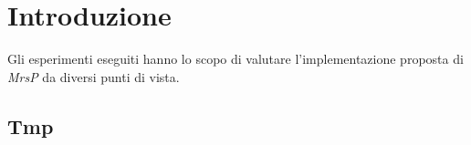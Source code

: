 \section{Introduzione}
\label{sec:introduzione}

\noindent Gli esperimenti eseguiti hanno lo scopo di valutare l'implementazione proposta di \textit{MrsP} da diversi punti di vista.\\

\subsection{Tmp}
\label{sec:introduzione_}